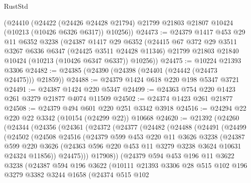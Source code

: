 \begin{lexlean}{RustStd}
\begin{coremodule}
    (@24410
      (@24422
        (@24426 @24428 @21794)
        @21799
        @21803
        @21807
        @10424
        (@10213 (@10426 @6326 @6317))
        @10256))
@24473 := @24379
    @1417
    @453
    @29
    @11
    @6352
    @3238
    (@24387
      @1417
      @29
      @6352
      (@24415
        @67
        @372
        @29
        @3511
        @3267
        @6336
        @6347
        (@24425 @3511 @24428 @11346)
        @21799
        @21803
        @21840
        @10424
        (@10213 (@10426 @6347 @6337))
        @10256))
@24475 := @10224 @21393 @3306
@24482 := @24385 (@24390 (@24398 (@24401 (@24442 (@24473 @24475))) @21859))
@24488 := @24379 @1424 @618 @220 @198 @5347 @3721
@24491 := @24387 @1424 @220 @5347
@24499 := @24363 @754 @220 @1423 @261 @3279 @21877 @4074 @11509
@24502 := @24374 @1423 @261 @21877
@24508 := @24379 @494 @601 @220 @251 @3342 @3918
@24516 := @24294 @22 @220 @22 @3342 (@10154 (@24299 @22)) @10668
@24620 := @21392
    (@24260
      (@24344
        (@24356
          (@24361
            (@24372
              (@24377
                (@24482
                  (@24488
                    (@24491
                      (@24499
                        (@24502
                          (@24508
                            @24516
                            (@24379
                              @599
                              @453
                              @220
                              @11
                              @3626
                              @3238
                              (@24387
                                @599
                                @220
                                @3626
                                (@24363 @596 @220 @453 @11 @3279 @3238 @3624 @10631 @24324 @11856))
                              @24475)))
                        @17908))
                    (@24379
                      @594
                      @453
                      @196
                      @11
                      @3622
                      @3238
                      (@24387
                        @594
                        @196
                        @3622
                        (@10111
                          @21393
                          @3306
                          @28
                          @515
                          @102
                          @196
                          @3279
                          @3382
                          @3244
                          @1658
                          (@24374
                            @515
                            @102

\end{coremodule}
\end{lexlean}
